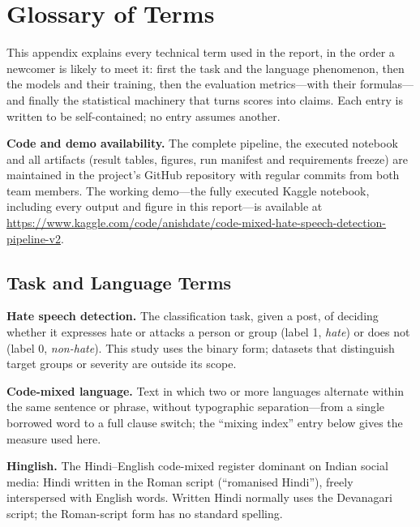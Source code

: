 \appendix
\chapter{Glossary of Terms}
\label{app:glossary}
\begingroup\small{}

This appendix explains every technical term used in the report, in the order a
newcomer is likely to meet it: first the task and the language phenomenon, then
the models and their training, then the evaluation metrics---with their
formulas---and finally the statistical machinery that turns scores into claims.
Each entry is written to be self-contained; no entry assumes another.

\vspace{4pt}
\noindent\textbf{Code and demo availability.} The complete pipeline, the executed
notebook and all artifacts (result tables, figures, run manifest and
requirements freeze) are maintained in the project's GitHub repository with
regular commits from both team members. The working demo---the fully executed
Kaggle notebook, including every output and figure in this report---is available
at \url{https://www.kaggle.com/code/anishdate/code-mixed-hate-speech-detection-pipeline-v2}.

\section{Task and Language Terms}
\label{app:task}

\textbf{Hate speech detection.} The classification task, given a post, of deciding
whether it expresses hate or attacks a person or group (label 1, \emph{hate}) or
does not (label 0, \emph{non-hate}). This study uses the binary form; datasets
that distinguish target groups or severity are outside its scope.

\textbf{Code-mixed language.} Text in which two or more languages alternate
within the same sentence or phrase, without typographic separation---from a single
borrowed word to a full clause switch; the ``mixing index'' entry below gives the
measure used here.

\textbf{Hinglish.} The Hindi--English code-mixed register dominant on Indian
social media: Hindi written in the Roman script (``romanised Hindi''), freely
interspersed with English words. Written Hindi normally uses the Devanagari
script; the Roman-script form has no standard spelling.

